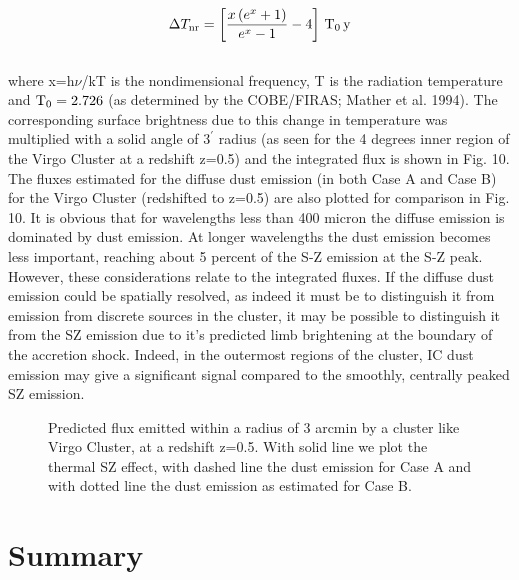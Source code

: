 \documentclass[]{aa}
\begin{document}
\begin{eqnarray}
\Delta T_{\rm nr} = \left [ \frac{x\,(e^x+1)}{e^x-1}-4\right]\,{\rm T}_0\,{\rm y}
\end{eqnarray}
\\
where x=h${\nu}$/kT is the nondimensional frequency, T is the radiation
temperature and ${\rm T}_0=2.726$ (as determined by the COBE/FIRAS; Mather et
al. 1994). The corresponding surface brightness due to this change in
temperature was multiplied with a solid angle of $3^{\prime}$ radius (as
seen for the 4 degrees inner region of the Virgo Cluster at a 
redshift z=0.5) and the
integrated flux is shown in Fig. 10. The fluxes estimated for the diffuse dust
emission (in both Case A and Case B) for the Virgo Cluster (redshifted to
z=0.5) are also plotted for comparison in Fig. 10. It is obvious that for 
wavelengths less than 400 micron the diffuse emission is dominated by dust 
emission. At longer wavelengths the dust emission becomes less important, 
reaching about 5 percent of the S-Z emission at the S-Z peak.
However, these considerations relate to the integrated fluxes. 
If the diffuse dust emission could be spatially resolved, as indeed it must
be to distinguish it from emission from discrete sources in the cluster,
it may be possible to distinguish it from the SZ emission due to it's 
predicted limb brightening at the boundary of the accretion shock. Indeed,
in the outermost regions of the cluster, IC dust emission may
give a significant signal compared to the smoothly, centrally peaked SZ 
emission. 

\begin{figure}[htb]
\caption[]{Predicted flux emitted within a radius of 3 arcmin by a cluster like
Virgo Cluster, at a redshift z=0.5. With solid line we plot the 
thermal SZ effect, with
dashed line the dust emission for Case A and with dotted line the dust emission
as estimated for Case B.}
\end{figure} 

\section{Summary}
\end{document}
